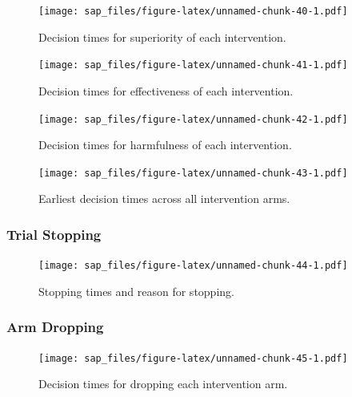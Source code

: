 \documentclass[
  bibliography=totoc]{scrreprt}
\begin{document}
\begin{figure}
\centering
\texttt{[image: sap\_files/figure-latex/unnamed-chunk-40-1.pdf]}
\caption{\label{fig:unnamed-chunk-40}Decision times for superiority of each intervention.}
\end{figure}

\begin{figure}
\centering
\texttt{[image: sap\_files/figure-latex/unnamed-chunk-41-1.pdf]}
\caption{\label{fig:unnamed-chunk-41}Decision times for effectiveness of each intervention.}
\end{figure}

\begin{figure}
\centering
\texttt{[image: sap\_files/figure-latex/unnamed-chunk-42-1.pdf]}
\caption{\label{fig:unnamed-chunk-42}Decision times for harmfulness of each intervention.}
\end{figure}

\begin{figure}
\centering
\texttt{[image: sap\_files/figure-latex/unnamed-chunk-43-1.pdf]}
\caption{\label{fig:unnamed-chunk-43}Earliest decision times across all intervention arms.}
\end{figure}

\clearpage

\hypertarget{trial-stopping-3}{%
\subsubsection{Trial Stopping}\label{trial-stopping-3}}

\begin{figure}
\centering
\texttt{[image: sap\_files/figure-latex/unnamed-chunk-44-1.pdf]}
\caption{\label{fig:unnamed-chunk-44}Stopping times and reason for stopping.}
\end{figure}

\clearpage

\hypertarget{arm-dropping-3}{%
\subsubsection{Arm Dropping}\label{arm-dropping-3}}

\begin{figure}
\centering
\texttt{[image: sap\_files/figure-latex/unnamed-chunk-45-1.pdf]}
\caption{\label{fig:unnamed-chunk-45}Decision times for dropping each intervention arm.}
\end{figure}

\clearpage
\end{document}
